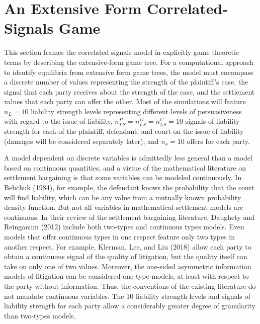 \documentclass{article}
\begin{document}
\section{An Extensive Form Correlated-Signals Game}

This section frames the correlated signals model in explicitly game theoretic terms by describing the extensive-form game tree. For a computational approach to identify equilibria from extensive form game trees, the model must encompass a discrete number of values representing the strength of the plaintiff's case, the signal that each party receives about the strength of the case, and the settlement values that each party can offer the other. Most of the simulations will feature $n_{L}=10$ liability strength levels representing different levels of persuasiveness with regard to the issue of liability, $n_{LS}^P=n_{LS}^D=n_{LS}^C=10$ signals of liability strength for each of the plaintiff, defendant, and court on the issue of liability (damages will be considered separately later), and  $n_{\mathcal{o}}=10$ offers for each party. 

A model dependent on discrete variables is admittedly less general than a model based on continuous quantities, and a virtue of the mathematical literature on settlement bargaining is that some variables can be modeled continuously. In Bebchuk (1984)\cite{bebchuk84}, for example, the defendant knows the probability that the court will find liability, which can be any value from a mutually known probability density function. But not all variables in mathematical settlement models are continuous. In their review of the settlement bargaining literature, Daughety and Reinganum (2012) \cite{daughetyreinganum2012} include both two-types and continuous types models. Even models that offer continuous types in one respect feature only two types in another respect. For example, Klerman, Lee, and Liu (2018) \cite{klermanleeliu} allow each party to obtain a continuous signal of the quality of litigation, but the quality itself can take on only one of two values. Moreover, the one-sided asymmetric information models of litigation can be considered one-type models, at least with respect to the party without information.  Thus, the conventions of the existing literature do not mandate continuous variables. The 10 liability strength levels and signals of liability strength for each party allow a considerably greater degree of granularity than two-types models. 
\end{document}
